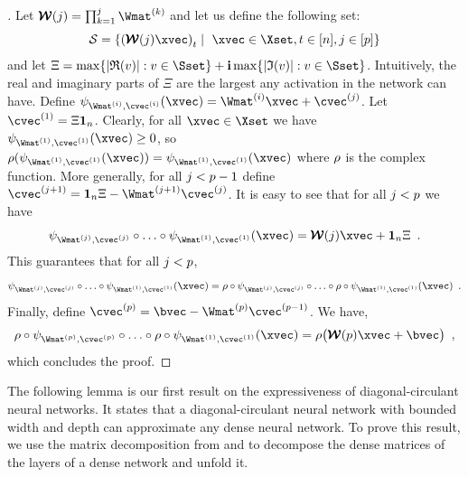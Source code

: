 \begin{proof}[]
  Let $\pmb{\mathcal{W}}(j) = \prod_{k=1}^{j} \Wmat^{(k)}$ and let us define the following set:
  \begin{equation}
    \mathcal{S} = \left\{ \left(\pmb{\mathcal{W}}(j) \xvec \right)_{t} \mid \ \xvec \in \Xset, t \in [n], j \in [\depth] \right\}
  \end{equation}
  and let $\Xi = \max\left\{ |\mathfrak{R}(v)|: v \in \Sset \right\} + \ci \max\left\{ |\mathfrak{I}(v)|:v \in \Sset \right\}$.
  Intuitively, the real and imaginary parts of $\Xi$ are the largest any activation in the network can have.
  Define $\psi_{\Wmat^{(i)}, \cvec^{(i)}}(\xvec) = \Wmat^{(i)} \xvec + \cvec^{(j)}$. Let $\cvec^{(1)} = \Xi \onevec{n}$.
  Clearly, for all $\xvec \in \Xset$ we have $\psi_{\Wmat^{(1)}, \cvec^{(1)}}(\xvec) \ge 0$, so $\act(\psi_{\Wmat^{(1)}, \cvec^{(1)}}(\xvec)) = \psi_{\Wmat^{(1)}, \cvec^{(1)}}(\xvec)$ where $\rho$ is the complex \relu function.
  \noindent
  More generally, for all $j < p-1$ define $\cvec^{(j+1)} = \onevec{n} \Xi - \Wmat^{(j+1)} \cvec^{(j)}$.
  It is easy to see that for all $j < p$ we have 
  \begin{equation}
    \psi_{\Wmat^{(j)}, \cvec^{(j)}}\circ \ldots \circ \psi_{\Wmat^{(1)}, \cvec^{(1)}}(\xvec) = \pmb{\mathcal{W}}(j) \xvec + \onevec{n} \Xi \enspace.
  \end{equation}
  This guarantees that for all $j < p$,
  \begin{equation}
    \psi_{\Wmat^{(j)}, \cvec^{(j)}} \circ \ldots \circ \psi_{\Wmat^{(1)}, \cvec^{(1)}}(\xvec) = \act \circ \psi_{\Wmat^{(j)}, \cvec^{(j)}} \circ \ldots \circ \act \circ \psi_{\Wmat^{(1)}, \cvec^{(1)}}(\xvec) \enspace.
  \end{equation}
  Finally, define $\cvec^{(\depth)} = \bvec - \Wmat^{(\depth)} \cvec^{(\depth-1)}$.
  We have,
  \begin{equation}
    \act \circ \psi_{\Wmat^{(\depth)}, \cvec^{(\depth)}} \circ \ldots \circ \act \circ \psi_{\Wmat^{(1)}, \cvec^{(1)}}(\xvec) = \act \big( \pmb{\mathcal{W}}(\depth) \xvec + \bvec \big) \enspace,
  \end{equation}
  which concludes the proof.
\end{proof}
  
The following lemma is our first result on the expressiveness of diagonal-circulant neural networks.
It states that a diagonal-circulant neural network with bounded width and depth can approximate any dense neural network.
To prove this result, we use the matrix decomposition from  and  to decompose the dense matrices of the layers of a dense network and unfold it.

